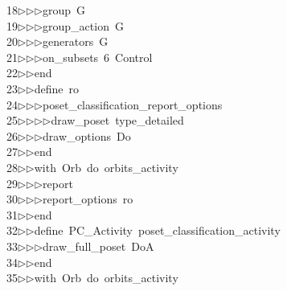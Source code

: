 \begin{tabbing}
18\>$\triangleright$\>$\triangleright$\>$\triangleright$\>group\ G\ \\[0pt]
19\>$\triangleright$\>$\triangleright$\>$\triangleright$\>group\_action\ G\ \\[0pt]
20\>$\triangleright$\>$\triangleright$\>$\triangleright$\>generators\ G\ \\[0pt]
21\>$\triangleright$\>$\triangleright$\>$\triangleright$\>on\_subsets\ 6\ Control\ \\[0pt]
22\>$\triangleright$\>$\triangleright$\>end\ \\[0pt]
23\>$\triangleright$\>$\triangleright$\>define\ ro\ \\[0pt]
24\>$\triangleright$\>$\triangleright$\>$\triangleright$\>poset\_classification\_report\_options\ \\[0pt]
25\>$\triangleright$\>$\triangleright$\>$\triangleright$\>$\triangleright$\>draw\_poset\ type\_detailed\ \\[0pt]
26\>$\triangleright$\>$\triangleright$\>$\triangleright$\>draw\_options\ Do\ \\[0pt]
27\>$\triangleright$\>$\triangleright$\>end\ \\[0pt]
28\>$\triangleright$\>$\triangleright$\>with\ Orb\ do\ orbits\_activity\ \\[0pt]
29\>$\triangleright$\>$\triangleright$\>$\triangleright$\>report\ \ \\[0pt]
30\>$\triangleright$\>$\triangleright$\>$\triangleright$\>report\_options\ ro\ \\[0pt]
31\>$\triangleright$\>$\triangleright$\>end\ \\[0pt]
32\>$\triangleright$\>$\triangleright$\>define\ PC\_Activity\ poset\_classification\_activity\ \\[0pt]
33\>$\triangleright$\>$\triangleright$\>$\triangleright$\>draw\_full\_poset\ DoA\ \\[0pt]
34\>$\triangleright$\>$\triangleright$\>end\ \\[0pt]
35\>$\triangleright$\>$\triangleright$\>with\ Orb\ do\ orbits\_activity\ \\[0pt]

\end{tabbing}

